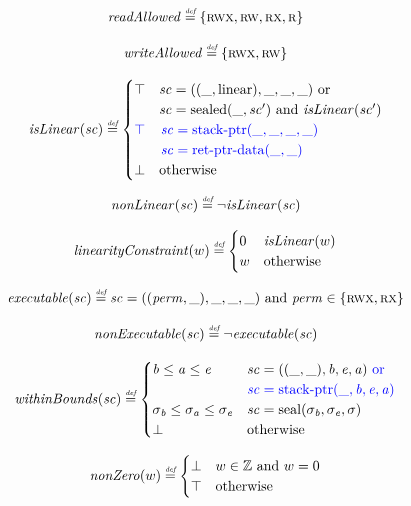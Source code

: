 \documentclass[a3paper]{article}
\newcommand{\defeq}{\stackrel{\textit{\tiny{def}}}{=}}
\newcommand{\tand}{\text{ and }}
\newcommand{\tor}{\text{ or }}
\newcommand{\totherwise}{\text{otherwise }}
\newcommand{\sourcecolor}{\color{blue}}
\newcommand{\src}[1]{{\sourcecolor #1}}
\newcommand{\ints}{\mathbb{Z}}
\newcommand{\shareddom}[1]{\mathrm{#1}}
\newcommand{\perm}{\var{perm}}
\newcommand{\stkptr}[1]{\mathrm{stack\text{-}ptr}(#1)}
\newcommand{\retptrd}{\mathrm{ret\text{-}ptr\text{-}data}}
\newcommand{\seal}[1]{\shareddom{seal}(#1)}
\newcommand{\sealed}[1]{\shareddom{sealed}(#1)}
\newcommand{\var}[1]{\mathit{#1}}
\newcommand{\vsc}{\var{sc}}
\newcommand{\cb}{\vsc}
\newcommand{\baddr}{\var{b}}
\newcommand{\eaddr}{\var{e}}
\newcommand{\aaddr}{\var{a}}
\newcommand{\plainlinearity}[1]{\mathrm{#1}}
\newcommand{\linear}{\plainlinearity{linear}}
\newcommand{\plainperm}[1]{\textsc{#1}}
\newcommand{\rwx}{\plainperm{rwx}}
\newcommand{\rx}{\plainperm{rx}}
\newcommand{\rw}{\plainperm{rw}}
\newcommand{\readonly}{\plainperm{r}}
\newcommand{\ro}{\readonly}
\newcommand{\plainfun}[2]{
  \ifthenelse{\equal{#2}{}}
  {\mathit{#1}}
  {\mathit{#1}(#2)}
}
\newcommand{\exec}[1]{\plainfun{executable}{#1}}
\newcommand{\isLinear}[1]{\plainfun{isLinear}{#1}}
\newcommand{\linCons}[1]{\plainfun{linearityConstraint}{#1}}
\newcommand{\nonExec}[1]{\plainfun{nonExecutable}{#1}}
\newcommand{\nonLinear}[1]{\plainfun{nonLinear}{#1}}
\newcommand{\nonZero}[1]{\plainfun{nonZero}{#1}}
\newcommand{\readAllowed}[1]{\plainfun{readAllowed}{#1}}
\newcommand{\withinBounds}[1]{\plainfun{withinBounds}{#1}}
\newcommand{\writeAllowed}[1]{\plainfun{writeAllowed}{#1}}
\begin{document}
\[
  \readAllowed{} \defeq \{ \rwx,\rw,\rx,\ro \}
\]

\[
  \writeAllowed{} \defeq \{ \rwx, \rw \}
\]

\[
  \isLinear{\cb} \defeq
  \begin{cases}
    \top & 
    \arraycolsep=0pt
    \begin{array}[t]{l}
      \cb = ((\_,\linear),\_,\_,\_) \tor\\
      \cb = \sealed{\_,\cb'} \tand \isLinear{\cb'} 
    \end{array}\\
    \src{\top} & 
    \sourcecolor\left.
    \arraycolsep=0pt
    \begin{array}[t]{l}
      \cb = \stkptr{\_,\_,\_,\_}\\
      \cb = \retptrd(\_,\_)
    \end{array}\right.\\
    \bot & \totherwise
  \end{cases}
\]

\[
  \nonLinear{\cb} \defeq \neg \isLinear{\cb}
\]

\[
  \linCons{w} \defeq
  \begin{cases}
    0 & \isLinear{w} \\
    w & \totherwise
  \end{cases}
\]

\[
  \exec{\cb} \defeq 
      \cb = ((\perm, \_), \_, \_, \_) \tand \perm \in \{\rwx,\rx\} 
\]

\[
  \nonExec{\cb} \defeq \neg \exec{\cb}
\]

\[
  \withinBounds{\vsc} \defeq 
  \begin{cases}
    \baddr \leq \aaddr \leq \eaddr & 
    \arraycolsep=0pt
    \begin{array}[t]{l}
      \vsc = ((\_,\_),\baddr,\eaddr,\aaddr) \src{\tor}\\
      \src{\vsc = \stkptr{\_,\baddr,\eaddr,\aaddr}}
    \end{array}\\
    \sigma_\baddr \leq \sigma_\aaddr \leq \sigma_\eaddr & \vsc = \seal{\sigma_\baddr,\sigma_\eaddr,\sigma} \\
    \bot & \totherwise
  \end{cases}
\]

\[
  \nonZero{w} \defeq
  \begin{cases}
    \bot & w \in \ints \tand w = 0 \\
    \top & \totherwise
  \end{cases}
\]
\end{document}
